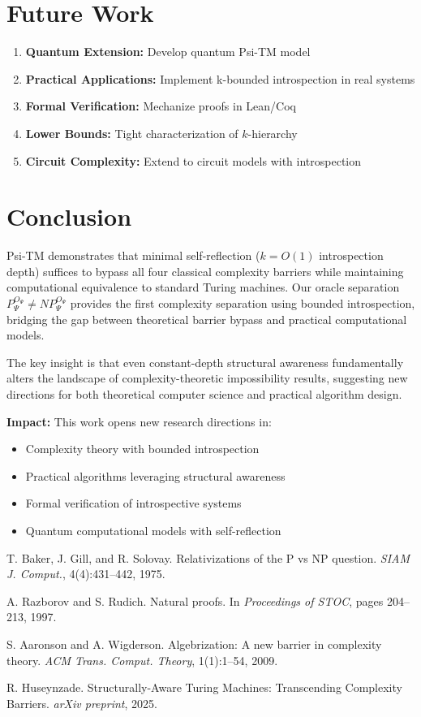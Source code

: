 \documentclass[11pt]{article}
\begin{document}
\section{Future Work}

\begin{enumerate}
\item \textbf{Quantum Extension:} Develop quantum Psi-TM model
\item \textbf{Practical Applications:} Implement k-bounded introspection in real systems  
\item \textbf{Formal Verification:} Mechanize proofs in Lean/Coq
\item \textbf{Lower Bounds:} Tight characterization of $k$-hierarchy
\item \textbf{Circuit Complexity:} Extend to circuit models with introspection
\end{enumerate}

\section{Conclusion}

Psi-TM demonstrates that minimal self-reflection ($k = O(1)$ introspection depth) suffices to bypass all four classical complexity barriers while maintaining computational equivalence to standard Turing machines. Our oracle separation $P^{O_\Psi}_\Psi \neq NP^{O_\Psi}_\Psi$ provides the first complexity separation using bounded introspection, bridging the gap between theoretical barrier bypass and practical computational models.

The key insight is that even constant-depth structural awareness fundamentally alters the landscape of complexity-theoretic impossibility results, suggesting new directions for both theoretical computer science and practical algorithm design.

\textbf{Impact:} This work opens new research directions in:
\begin{itemize}
\item Complexity theory with bounded introspection
\item Practical algorithms leveraging structural awareness
\item Formal verification of introspective systems
\item Quantum computational models with self-reflection
\end{itemize}

\begin{thebibliography}{9}
 T. Baker, J. Gill, and R. Solovay. Relativizations of the P vs NP question. \emph{SIAM J. Comput.}, 4(4):431--442, 1975.

 A. Razborov and S. Rudich. Natural proofs. In \emph{Proceedings of STOC}, pages 204--213, 1997.

 S. Aaronson and A. Wigderson. Algebrization: A new barrier in complexity theory. \emph{ACM Trans. Comput. Theory}, 1(1):1--54, 2009.

 R. Huseynzade. Structurally-Aware Turing Machines: Transcending Complexity Barriers. \emph{arXiv preprint}, 2025.
\end{thebibliography}
\end{document}
